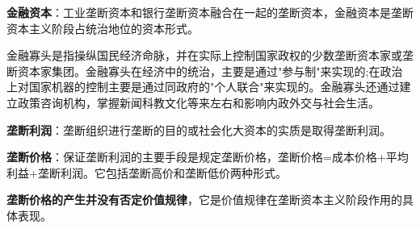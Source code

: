 \textbf{金融资本}：工业垄断资本和银行垄断资本融合在一起的垄断资本，金融资本是垄断资本主义阶段占统治地位的资本形式。

金融寡头是指操纵国民经济命脉，并在实际上控制国家政权的少数垄断资本家或垄断资本家集团。{金融寡头在经济中的统治，主要是通过}{"}{参与制}{"}{来实现的}{;}{在政治上对国家机器的控制主要是通过同政府的}{"}{个人联合}{"}{来实现的。金融寡头还通过建立政策咨询机构，掌握新闻科教文化等来左右和影响内政外交与社会生活}。

\textbf{{垄断利润}}{：垄断组织进行垄断的目的或社会化大资本的实质是取得垄断利润。}

\textbf{{垄断价格}}{：保证垄断利润的主要手段是规定垄断价格，}{垄断价格}{=}{成本价格}{+平均利益+}{垄断利润}{。它包括垄断高价和垄断低价两种形式。}

\textbf{{垄断价格的产生并没有否定价值规律}}{，它是价值规律在垄断资本主义阶段作用的具体表现。}
